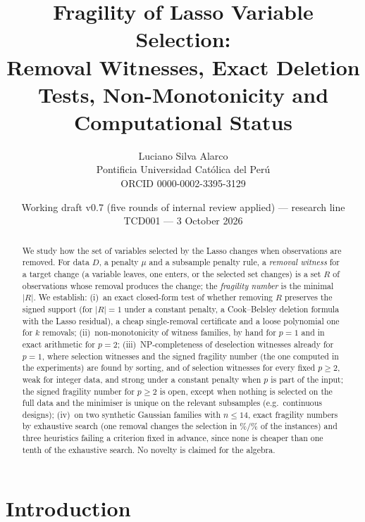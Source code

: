 \documentclass[10pt,a4paper]{article}
\title{\textbf{Fragility of Lasso Variable Selection:}\\[2pt]
\large Removal Witnesses, Exact Deletion Tests, Non-Monotonicity and Computational Status}
\author{Luciano Silva Alarco\\
\small Pontificia Universidad Cat\'olica del Per\'u\\
\small ORCID 0000-0002-3395-3129}
\date{\small Working draft v0.7 (five rounds of internal review applied) --- research line TCD001 --- 3 October 2026}
\theoremstyle{plain}
\theoremstyle{definition}
\theoremstyle{remark}
\begin{document}
\maketitle

\begin{abstract}
\noindent
We study how the set of variables selected by the Lasso changes when observations are removed. For data $D$, a penalty $\mu$ and a subsample penalty rule, a \emph{removal witness} for a target change (a variable leaves, one enters, or the selected set changes) is a set $R$ of observations whose removal produces the change; the \emph{fragility number} is the minimal $|R|$. We establish: (i)~an exact closed-form test of whether removing $R$ preserves the signed support (for $|R|=1$ under a constant penalty, a Cook--Belsley deletion formula with the Lasso residual), a cheap single-removal certificate and a loose polynomial one for $k$ removals; (ii)~non-monotonicity of witness families, by hand for $p=1$ and in exact arithmetic for $p=2$; (iii)~NP-completeness of deselection witnesses already for $p=1$, where selection witnesses and the signed fragility number (the one computed in the experiments) are found by sorting, and of selection witnesses for every fixed $p\ge2$, weak for integer data, and strong under a constant penalty when $p$ is part of the input; the signed fragility number for $p\ge2$ is open, except when nothing is selected on the full data and the minimiser is unique on the relevant subsamples (e.g.\ continuous designs); (iv)~on two synthetic Gaussian families with $n\le14$, exact fragility numbers by exhaustive search (one removal changes the selection in \EtwoBFracOne\%/\EtwoAFracOne\% of the instances) and three heuristics failing a criterion fixed in advance, since none is cheaper than one tenth of the exhaustive search. No novelty is claimed for the algebra.
\end{abstract}

\section{Introduction}\label{sec:intro}
\end{document}
